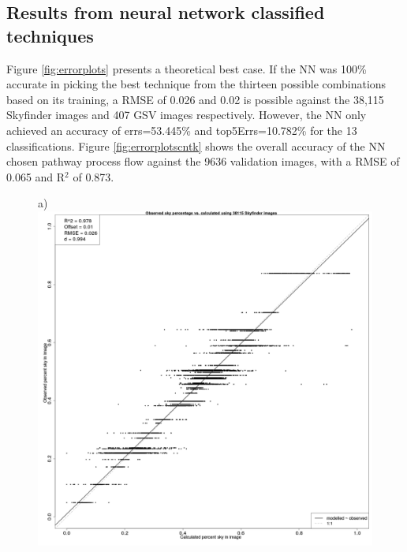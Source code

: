 \documentclass[final,3p,times,authoryear]{elsarticle}
\begin{document}
\subsection{Results from neural network classified techniques}\label{sec:resultsnn}
Figure \ref{fig:errorplots} presents a theoretical best case. If the NN was 100\% accurate in picking the best technique from the thirteen possible combinations based on its training, a RMSE of 0.026 and 0.02 is possible against the 38,115 Skyfinder images and 407 GSV images respectively. However, the NN only achieved an accuracy of errs=53.445\% and top5Errs=10.782\% for the 13 classifications. Figure \ref{fig:errorplotscntk} shows the overall accuracy of the NN chosen pathway process flow against the 9636 validation images, with a RMSE of 0.065 and R$^{2}$ of 0.873.

\begin{figure}
\centering
a)\includegraphics[scale=0.12]{Images/ErrorPlots.png}

\end{figure}
\end{document}
